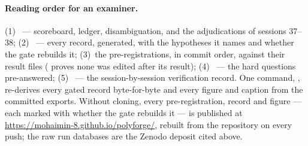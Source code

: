 \paragraph{Reading order for an examiner.} (1)~
--- scoreboard, ledger, disambiguation, and the adjudications of sessions
37--38; (2)~ --- every record, generated, with the
hypotheses it names and whether the gate rebuilds it; (3)~the
pre-registrations, in commit order, against their result files
( proves none was edited after its
result); (4)~ --- the hard questions
pre-answered; (5)~ --- the session-by-session
verification record. One command, ,
re-derives every gated record byte-for-byte and every figure and caption
from the committed exports. Without cloning, every pre-registration, record
and figure --- each marked with whether the gate rebuilds it --- is published
at \url{https://mohaimin-8.github.io/polyforge/}, rebuilt from the
repository on every push; the raw run databases are the Zenodo deposit
cited above.
